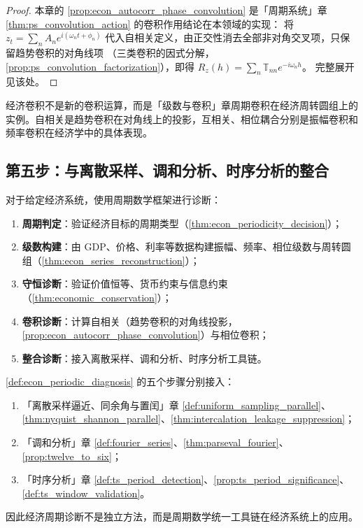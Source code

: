 \begin{proof}
本章的 \cref{prop:econ_autocorr_phase_convolution} 是「周期系统」章 \cref{thm:ps_convolution_action} 的卷积作用结论在本领域的实现：
将 $z_t=\sum_n A_n e^{i(\omega_n t+\phi_n)}$ 代入自相关定义，由正交性消去全部非对角交叉项，只保留趋势卷积的对角线项
（三类卷积的因式分解，\cref{prop:ps_convolution_factorization}），即得 $R_z(h)=\sum_n\mathbb T_{nn}e^{-i\omega_n h}$。
完整展开见该处。
\end{proof}

\begin{remark}[经济卷积与周期卷积的关系]\label{rem:econ_convolution_relation}
经济卷积不是新的卷积运算，而是「级数与卷积」章周期卷积在经济周转圆组上的实例。自相关是趋势卷积在对角线上的投影，互相关、相位耦合分别是振幅卷积和频率卷积在经济学中的具体表现。
\end{remark}

\subsection{第五步：与离散采样、调和分析、时序分析的整合}

\begin{definition}[经济周期诊断流程]\label{def:econ_periodic_diagnosis}
对于给定经济系统，使用周期数学框架进行诊断：
\begin{enumerate}[label=(\roman*)]
    \item \textbf{周期判定}：验证经济目标的周期类型（\cref{thm:econ_periodicity_decision}）；
    \item \textbf{级数构建}：由 GDP、价格、利率等数据构建振幅、频率、相位级数与周转圆组（\cref{thm:econ_series_reconstruction}）；
    \item \textbf{守恒诊断}：验证价值恒等、货币约束与信息约束（\cref{thm:economic_conservation}）；
    \item \textbf{卷积诊断}：计算自相关（趋势卷积的对角线投影，\cref{prop:econ_autocorr_phase_convolution}）与相位卷积；
    \item \textbf{整合诊断}：接入离散采样、调和分析、时序分析工具链。
\end{enumerate}
\end{definition}

\begin{theorem}[经济周期诊断流程与三章接口]\label{thm:econ_diagnosis_integration}
\cref{def:econ_periodic_diagnosis} 的五个步骤分别接入：
\begin{enumerate}[label=(\roman*)]
    \item 「离散采样逼近、同余角与置闰」章 \cref{def:uniform_sampling_parallel}、\cref{thm:nyquist_shannon_parallel}、\cref{thm:intercalation_leakage_suppression}；
    \item 「调和分析」章 \cref{def:fourier_series}、\cref{thm:parseval_fourier}、\cref{prop:twelve_to_six}；
    \item 「时序分析」章 \cref{def:ts_period_detection}、\cref{prop:ts_period_significance}、\cref{def:ts_window_validation}。
\end{enumerate}
因此经济周期诊断不是独立方法，而是周期数学统一工具链在经济系统上的应用。
\end{theorem}

